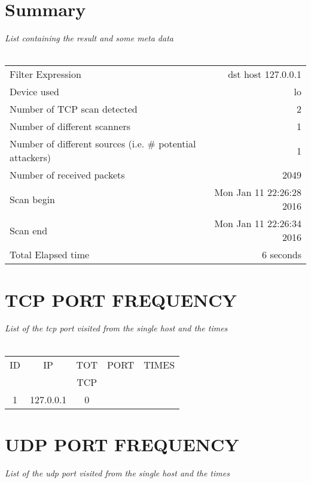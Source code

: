 \documentclass[a4paper]{scrartcl}
\begin{document}
\section{Summary}
\emph{List containing the result and some meta data} \\ \\ 
\begin{tabular}{| l | r |}
\hline
Filter Expression & dst host 127.0.0.1 \\ 
Device used & lo \\ 
Number of TCP scan detected & 2 \\ 
Number of different scanners & 1 \\ 
Number of different sources (i.e. \# potential attackers) & 1 \\ 
Number of received packets &  2049 \\ 
Scan begin & Mon Jan 11 22:26:28 2016
 \\ 
Scan end & 	Mon Jan 11 22:26:34 2016
 \\ 
Total Elapsed time & 6 seconds \\ 
\hline
\end{tabular}
\newpage\section{TCP PORT FREQUENCY}
\emph{List of the tcp port visited from the single host and the times} \\ \\ 
\noindent\begin{minipage}[b]{0.5\linewidth}\begin{tabular}{| c | c | c | c | c |}
\hline
ID & IP & TOT & PORT & TIMES \\ 
   &    & TCP &      &       \\ 
\hline
1 & 127.0.0.1 & 0 & & \\ 
\hline
\end{tabular}
\end{minipage}\hfill\newpage\section{UDP PORT FREQUENCY}
\emph{List of the udp port visited from the single host and the times} \\ \\ 
\end{document}
